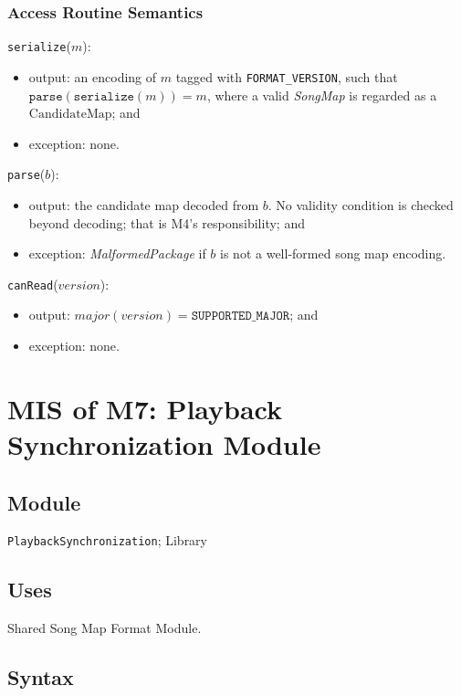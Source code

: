 \documentclass[12pt, titlepage]{article}
\begin{document}
\subsubsection{Access Routine Semantics}

\noindent \texttt{serialize}($m$):
\begin{itemize}
  \item output: an encoding of $m$ tagged with \texttt{FORMAT\_VERSION}, such
  that $\texttt{parse}(\texttt{serialize}(m)) = m$, where a valid
  \textit{SongMap} is regarded as a $\mathrm{CandidateMap}$; and
  \item exception: none.
\end{itemize}

\noindent \texttt{parse}($b$):
\begin{itemize}
  \item output: the candidate map decoded from $b$.  No validity condition is
  checked beyond decoding; that is M4's responsibility; and
  \item exception: \textit{MalformedPackage} if $b$ is not a well-formed song
  map encoding.
\end{itemize}

\noindent \texttt{canRead}($version$):
\begin{itemize}
  \item output: $major(version) = \texttt{SUPPORTED\_MAJOR}$; and
  \item exception: none.
\end{itemize}

\newpage

\section{MIS of M7: Playback Synchronization Module} \label{mPlaybackSync}

\subsection{Module}

\texttt{PlaybackSynchronization}; Library

\subsection{Uses}

Shared Song Map Format Module.

\subsection{Syntax}
\end{document}

